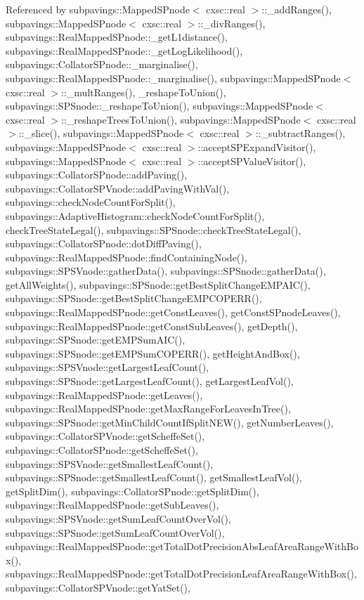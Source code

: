 \-Referenced by subpavings\-::\-Mapped\-S\-Pnode$<$ cxsc\-::real $>$\-::\-\_\-add\-Ranges(), subpavings\-::\-Mapped\-S\-Pnode$<$ cxsc\-::real $>$\-::\-\_\-div\-Ranges(), subpavings\-::\-Real\-Mapped\-S\-Pnode\-::\-\_\-get\-L1distance(), subpavings\-::\-Real\-Mapped\-S\-Pnode\-::\-\_\-get\-Log\-Likelihood(), subpavings\-::\-Collator\-S\-Pnode\-::\-\_\-marginalise(), subpavings\-::\-Real\-Mapped\-S\-Pnode\-::\-\_\-marginalise(), subpavings\-::\-Mapped\-S\-Pnode$<$ cxsc\-::real $>$\-::\-\_\-mult\-Ranges(), \-\_\-reshape\-To\-Union(), subpavings\-::\-S\-P\-Snode\-::\-\_\-reshape\-To\-Union(), subpavings\-::\-Mapped\-S\-Pnode$<$ cxsc\-::real $>$\-::\-\_\-reshape\-Trees\-To\-Union(), subpavings\-::\-Mapped\-S\-Pnode$<$ cxsc\-::real $>$\-::\-\_\-slice(), subpavings\-::\-Mapped\-S\-Pnode$<$ cxsc\-::real $>$\-::\-\_\-subtract\-Ranges(), subpavings\-::\-Mapped\-S\-Pnode$<$ cxsc\-::real $>$\-::accept\-S\-P\-Expand\-Visitor(), subpavings\-::\-Mapped\-S\-Pnode$<$ cxsc\-::real $>$\-::accept\-S\-P\-Value\-Visitor(), subpavings\-::\-Collator\-S\-Pnode\-::add\-Paving(), subpavings\-::\-Collator\-S\-P\-Vnode\-::add\-Paving\-With\-Val(), subpavings\-::check\-Node\-Count\-For\-Split(), subpavings\-::\-Adaptive\-Histogram\-::check\-Node\-Count\-For\-Split(), check\-Tree\-State\-Legal(), subpavings\-::\-S\-P\-Snode\-::check\-Tree\-State\-Legal(), subpavings\-::\-Collator\-S\-Pnode\-::dot\-Diff\-Paving(), subpavings\-::\-Real\-Mapped\-S\-Pnode\-::find\-Containing\-Node(), subpavings\-::\-S\-P\-S\-Vnode\-::gather\-Data(), subpavings\-::\-S\-P\-Snode\-::gather\-Data(), get\-All\-Weights(), subpavings\-::\-S\-P\-Snode\-::get\-Best\-Split\-Change\-E\-M\-P\-A\-I\-C(), subpavings\-::\-S\-P\-Snode\-::get\-Best\-Split\-Change\-E\-M\-P\-C\-O\-P\-E\-R\-R(), subpavings\-::\-Real\-Mapped\-S\-Pnode\-::get\-Const\-Leaves(), get\-Const\-S\-Pnode\-Leaves(), subpavings\-::\-Real\-Mapped\-S\-Pnode\-::get\-Const\-Sub\-Leaves(), get\-Depth(), subpavings\-::\-S\-P\-Snode\-::get\-E\-M\-P\-Sum\-A\-I\-C(), subpavings\-::\-S\-P\-Snode\-::get\-E\-M\-P\-Sum\-C\-O\-P\-E\-R\-R(), get\-Height\-And\-Box(), subpavings\-::\-S\-P\-S\-Vnode\-::get\-Largest\-Leaf\-Count(), subpavings\-::\-S\-P\-Snode\-::get\-Largest\-Leaf\-Count(), get\-Largest\-Leaf\-Vol(), subpavings\-::\-Real\-Mapped\-S\-Pnode\-::get\-Leaves(), subpavings\-::\-Real\-Mapped\-S\-Pnode\-::get\-Max\-Range\-For\-Leaves\-In\-Tree(), subpavings\-::\-S\-P\-Snode\-::get\-Min\-Child\-Count\-If\-Split\-N\-E\-W(), get\-Number\-Leaves(), subpavings\-::\-Collator\-S\-P\-Vnode\-::get\-Scheffe\-Set(), subpavings\-::\-Collator\-S\-Pnode\-::get\-Scheffe\-Set(), subpavings\-::\-S\-P\-S\-Vnode\-::get\-Smallest\-Leaf\-Count(), subpavings\-::\-S\-P\-Snode\-::get\-Smallest\-Leaf\-Count(), get\-Smallest\-Leaf\-Vol(), get\-Split\-Dim(), subpavings\-::\-Collator\-S\-Pnode\-::get\-Split\-Dim(), subpavings\-::\-Real\-Mapped\-S\-Pnode\-::get\-Sub\-Leaves(), subpavings\-::\-S\-P\-S\-Vnode\-::get\-Sum\-Leaf\-Count\-Over\-Vol(), subpavings\-::\-S\-P\-Snode\-::get\-Sum\-Leaf\-Count\-Over\-Vol(), subpavings\-::\-Real\-Mapped\-S\-Pnode\-::get\-Total\-Dot\-Precision\-Abs\-Leaf\-Area\-Range\-With\-Box(), subpavings\-::\-Real\-Mapped\-S\-Pnode\-::get\-Total\-Dot\-Precision\-Leaf\-Area\-Range\-With\-Box(), subpavings\-::\-Collator\-S\-P\-Vnode\-::get\-Yat\-Set(), 